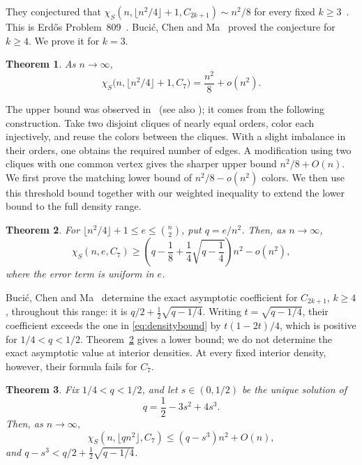 \documentclass[10pt]{article}
\newtheorem{thm}{Theorem}[section]
\theoremstyle{remark}
\begin{document}
They conjectured that $\chi_S(n,\lfloor n^2/4\rfloor+1,C_{2k+1})\sim n^2/8$ for every fixed $k\ge3$~\cite[p.~270]{BEGS}. This is Erd\H{o}s Problem~809~\cite{Bloom809}. Buci\'{c}, Chen and Ma~\cite{BCM} proved the conjecture for $k\ge4$. We prove it for $k=3$.

\begin{thm}\label{thm:main}
As $n\to\infty$,
\[
  \chi_S\bigl(n,\lfloor n^2/4\rfloor+1,C_7\bigr)
       =\frac{n^2}{8}+o(n^2).
\]
\end{thm}

The upper bound was observed in~\cite{BEGS} (see also \cite[Section 2]{BCM}); it comes from the following construction. Take two disjoint cliques of nearly equal orders, color each injectively, and reuse the colors between the cliques. With a slight imbalance in their orders, one obtains the required number of edges. A modification using two cliques with one common vertex gives the sharper upper bound $n^2/8+O(n)$. We first prove the matching lower bound of $n^2/8-o(n^2)$ colors. We then use this threshold bound together with our weighted inequality to extend the lower bound to the full density range.

\begin{thm}\label{thm:density}
For $\lfloor n^2/4\rfloor+1\le e\le\binom n2$, put $q=e/n^2$. Then, as $n\to\infty$,
\begin{equation}\label{eq:densitybound}
 \chi_S(n,e,C_7)\ge
 \left(q-\frac18+\frac14\sqrt{q-\frac14}\right)n^2-o(n^2),
\end{equation}
where the error term is uniform in $e$.
\end{thm}

Buci\'{c}, Chen and Ma~\cite[Theorem~1.2]{BCM} determine the exact asymptotic coefficient for $C_{2k+1}$, $k\ge4$, throughout this range: it is $q/2+\frac12\sqrt{q-1/4}$. Writing $t=\sqrt{q-1/4}$, their coefficient exceeds the one in \eqref{eq:densitybound} by $t(1-2t)/4$, which is positive for $1/4<q<1/2$. Theorem~\ref{thm:density} gives a lower bound; we do not determine the exact asymptotic value at interior densities. At every fixed interior density, however, their formula fails for $C_7$.

\begin{thm}\label{thm:interior}
Fix $1/4<q<1/2$, and let $s\in(0,1/2)$ be the unique solution of
\[
 q=\frac12-3s^2+4s^3.
\]
Then, as $n\to\infty$,
\[
 \chi_S(n,\lfloor qn^2\rfloor,C_7)\le(q-s^3)n^2+O(n),
\]
and $q-s^3<q/2+\frac12\sqrt{q-1/4}$.
\end{thm}
\end{document}
